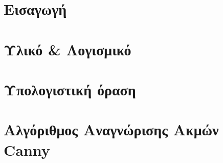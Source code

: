 \documentclass[a4paper,11pt,twoside,openright]{report}
\author{\me}
\begin{document}
\setcounter{page}{3}


\newblankpage


\newblankpage


\newblankpage

\cleardoublepage
{}


\cleardoublepage
{}


\cleardoublepage
{}

\newblankpage

\pagestyle{fancy}

\cleardoublepage
{}
{}
\renewcommand*\contentsname{Περιεχόμενα} %
\tableofcontents

\cleardoublepage
{}
{}
\renewcommand*\listfigurename{Κατάλογος Σχημάτων}
\listoffigures

\cleardoublepage
{}
\printglossary[type=\acronymtype, title=Ακρωνύμια]
\printglossary[title=Ορολογία]
\newblankpage

\setcounter{page}{1}

\chapter{Εισαγωγή}\label{ch:chap1}


\chapter{Υλικό \& Λογισμικό}\label{ch:chap2}


\chapter{Υπολογιστική όραση}\label{ch:chap3}


\chapter{Αλγόριθμος Αναγνώρισης Ακμών Canny}\label{ch:chap4}

\end{document}
